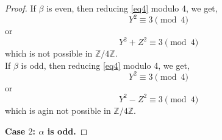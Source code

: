 \documentclass[12pt, reqno]{amsart}
\numberwithin{equation}{section}
\theoremstyle{definition}
\theoremstyle{nodefstyle}
\begin{document}
\begin{proof}
    If $\beta$ is even, then reducing \eqref{eq4} modulo 4, we get,
    \begin{equation*}
        Y^2 \equiv 3 \pmod{4} 
    \end{equation*} or 
    \begin{equation}
        Y^2+Z^2 \equiv 3 \pmod{4}
    \end{equation}
    which is not possible in $\mathbb{Z}/{4\mathbb{Z}}$.\\
    If $\beta$ is odd, then reducing \eqref{eq4} modulo 4, we get,
    \[Y^2 \equiv 3 \pmod{4}\] or
    \begin{equation}
        Y^2-Z^2 \equiv 3 \pmod{4}
    \end{equation}
    which is agin not possible in $\mathbb{Z}/{4\mathbb{Z}}$.
    \vspace{1mm}

    
    \textbf{Case $2$: $\alpha$ is odd.}
    \vspace{1mm}
    

\end{proof}
\end{document}
